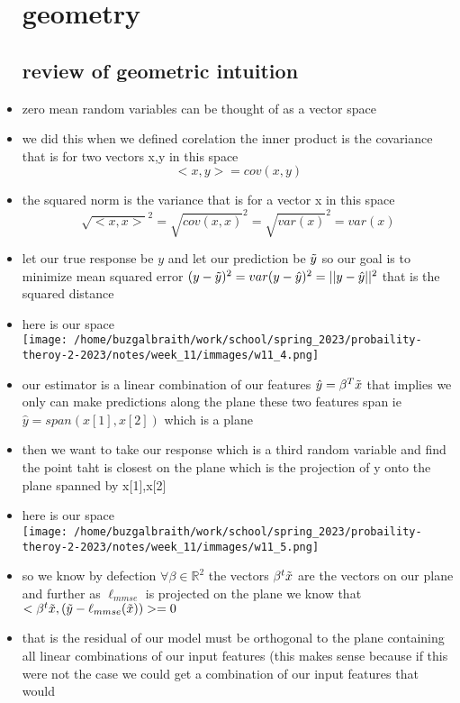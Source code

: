 \documentclass{article}
\begin{document}
\begin{itemize}
\section*{geometry}
\subsection*{review of geometric intuition}
\item zero mean random variables can be thought of as a vector space
\item we did this when we defined corelation the inner product is the covariance that is for two vectors x,y in this space 
$$<x,y>=cov(x,y)$$
\item the squared norm is the variance that is for a vector x in this space $$\sqrt{<x,x>}^2=\sqrt{cov(x,x)}^2=\sqrt{var(x)}^2=var(x)$$
\item let our true response be $y$ and let our prediction be $\Tilde{y}$ so our goal is to minimize mean squared error 
$(y-\Tilde{y})^2=var(y-\hat{y})^2=||y-\hat{y}||^2$ that is the squared distance
\item here is our space \\ \texttt{[image: /home/buzgalbraith/work/school/spring\_2023/probaility-theroy-2-2023/notes/week\_11/immages/w11\_4.png]}
\item our estimator is a linear combination of our features $\hat{y}=\beta^T\Tilde{x}$ that implies we only can make 
predictions along the plane these two features span ie $\hat{y}=span(x[1], x[2])$ which is a plane 
\item then we want to take our response which is a third random variable and find the point taht is closest on the plane
which is the projection of y onto the plane spanned by x[1],x[2]
\item here is our space \\ \texttt{[image: /home/buzgalbraith/work/school/spring\_2023/probaility-theroy-2-2023/notes/week\_11/immages/w11\_5.png]}
\item so we know by defection $\forall \beta \in \mathbb{R}^{2}$ the vectors $\beta^t\Tilde{x}$ are the vectors on our plane 
and further as $\ell_{mmse}$ is projected on the plane we know that $<\beta^t\Tilde{x}, (\Tilde{y}-\ell_{mmse}(\Tilde{x}))>=0$
\item that is the residual of our model must be orthogonal to the plane containing all linear combinations of our input 
features (this makes sense because if this were not the case we could get a combination of our input features that would

\end{itemize}
\end{document}
